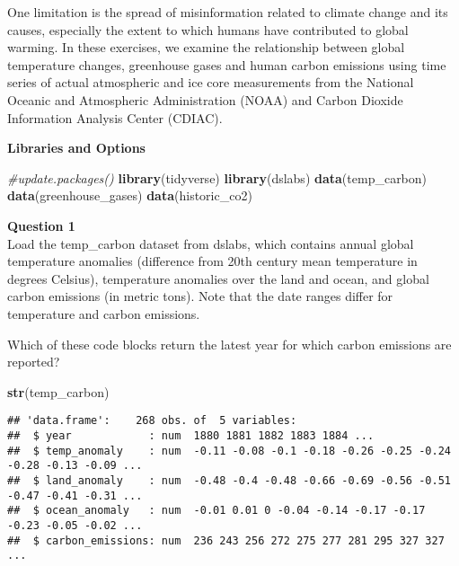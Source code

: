 \documentclass[]{article}
\newenvironment{Shaded}{\begin{snugshade}}{\end{snugshade}}
\newcommand{\CommentTok}[1]{\textcolor[rgb]{0.56,0.35,0.01}{\textit{#1}}}
\newcommand{\KeywordTok}[1]{\textcolor[rgb]{0.13,0.29,0.53}{\textbf{#1}}}
\newcommand{\NormalTok}[1]{#1}
\newcommand{\OperatorTok}[1]{\textcolor[rgb]{0.81,0.36,0.00}{\textbf{#1}}}
\newcommand{\StringTok}[1]{\textcolor[rgb]{0.31,0.60,0.02}{#1}}
\begin{document}
One limitation is the spread of misinformation related to climate change
and its causes, especially the extent to which humans have contributed
to global warming. In these exercises, we examine the relationship
between global temperature changes, greenhouse gases and human carbon
emissions using time series of actual atmospheric and ice core
measurements from the National Oceanic and Atmospheric Administration
(NOAA) and Carbon Dioxide Information Analysis Center (CDIAC).

\textbf{Libraries and Options}

\begin{Shaded}
\begin{Highlighting}[]
\CommentTok{#update.packages()}
\KeywordTok{library}\NormalTok{(tidyverse)}
\KeywordTok{library}\NormalTok{(dslabs)}
\KeywordTok{data}\NormalTok{(temp_carbon)}
\KeywordTok{data}\NormalTok{(greenhouse_gases)}
\KeywordTok{data}\NormalTok{(historic_co2)}
\end{Highlighting}
\end{Shaded}

\textbf{Question 1}\\
Load the temp\_carbon dataset from dslabs, which contains annual global
temperature anomalies (difference from 20th century mean temperature in
degrees Celsius), temperature anomalies over the land and ocean, and
global carbon emissions (in metric tons). Note that the date ranges
differ for temperature and carbon emissions.

Which of these code blocks return the latest year for which carbon
emissions are reported?

\begin{Shaded}
\begin{Highlighting}[]
\KeywordTok{str}\NormalTok{(temp_carbon)}
\end{Highlighting}
\end{Shaded}

\begin{verbatim}
## 'data.frame':    268 obs. of  5 variables:
##  $ year            : num  1880 1881 1882 1883 1884 ...
##  $ temp_anomaly    : num  -0.11 -0.08 -0.1 -0.18 -0.26 -0.25 -0.24 -0.28 -0.13 -0.09 ...
##  $ land_anomaly    : num  -0.48 -0.4 -0.48 -0.66 -0.69 -0.56 -0.51 -0.47 -0.41 -0.31 ...
##  $ ocean_anomaly   : num  -0.01 0.01 0 -0.04 -0.14 -0.17 -0.17 -0.23 -0.05 -0.02 ...
##  $ carbon_emissions: num  236 243 256 272 275 277 281 295 327 327 ...
\end{verbatim}

\begin{Shaded}
\end{Shaded}
\end{document}
